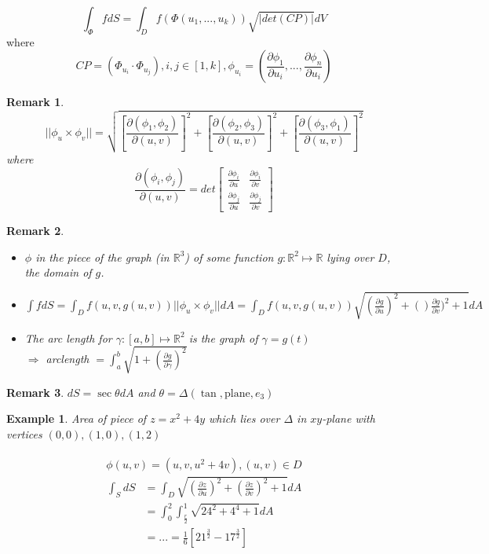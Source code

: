 \documentclass[12pt]{article}
\theoremstyle{plain}
\newtheorem*{remark}{Remark}
\newtheorem{example}[theorem]{Example}
\theoremstyle{definition}
\begin{document}
$$\int_\Phi f dS = \int_D f(\Phi (u_1,...,u_k)) \sqrt{|det(CP)|} dV$$
where
$$CP = (\Phi_{u_i} \cdot \Phi_{u_j}), i,j \in [1,k], \phi_{u_i} = (\frac{\partial \phi_1}{\partial u_i}, ..., \frac{\partial \phi_n}{\partial u_i})$$

\begin{remark}
	$$||\phi_u \times \phi_v|| = \sqrt{[\frac{\partial (\phi_1, \phi_2)}{\partial (u,v)}]^2 + [\frac{\partial (\phi_2, \phi_3)}{\partial (u,v)}]^2 + [\frac{\partial (\phi_3, \phi_1)}{\partial (u,v)}]^2}$$
	where
	$$\frac{\partial (\phi_i, \phi_j)}{\partial (u,v)} = det\begin{bmatrix}
	\frac{\partial \phi_i}{\partial u} & \frac{\partial \phi_i}{\partial v} \\
	\frac{\partial \phi_j}{\partial u} & \frac{\partial \phi_j}{\partial v}
	\end{bmatrix}$$
\end{remark}

\begin{remark}
	\begin{itemize}
		\item{$\phi$ in the piece of the graph (in $\mathbb{R}^3$) of some function $g:\mathbb{R}^2\mapsto \mathbb{R}$ lying over $D$, the domain of $g$.}
		\item{$\int f dS = \int_D f(u,v,g(u,v))||\phi_u \times \phi_v||dA = \int_D f(u,v,g(u,v)) \sqrt{(\frac{\partial g}{\partial u})^2 + ()\frac{\partial g}{\partial v})^2 + 1}dA$}
		\item{The arc length for $\gamma: [a,b] \mapsto \mathbb{R}^2$ is the graph of $\gamma=g(t)$\\
		$\Longrightarrow$ arclength $= \int^b_a \sqrt{1 + (\frac{\partial g}{\partial \gamma})^2}$}
	\end{itemize}
\end{remark}

\begin{remark}
	$dS = \sec\theta dA$ and $\theta = \Delta (\tan, \text{plane}, e_3)$
\end{remark}

\begin{example}
	Area of piece of $z=x^2+4y$ which lies over $\Delta$ in $xy$-plane with vertices $(0,0), (1,0), (1,2)$\\
	\\
	$$\phi (u,v) = (u,v,u^2 + 4v), (u,v) \in D$$
	\begin{align*}
		\int_S dS &= \int_D \sqrt{(\frac{\partial z}{\partial u})^2 + (\frac{\partial z}{\partial v})^2 + 1} dA\\
		&= \int^2_0 \int^1_{\frac{r}{2}} \sqrt{24^2 + 4^4 + 1} dA\\
		&= ... = \frac{1}{6} [21^{\frac{3}{2}} - 17^{\frac{3}{2}}]
	\end{align*}
\end{example}
\newpage
\end{document}
